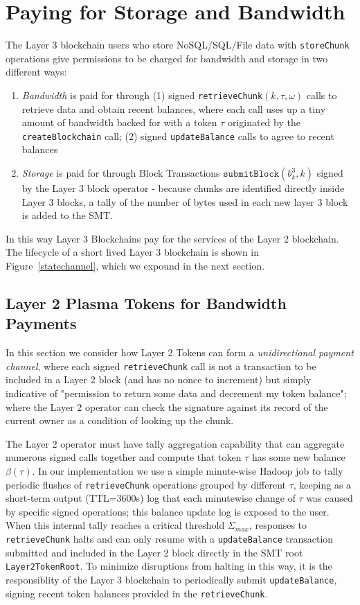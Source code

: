 \documentclass{article}
\newcommand{\blockhash}[2]{b^{#1}_{#2}}
\newcommand{\signature}{\omega}
\newcommand{\submitblock}[2]{\texttt{submitBlock}(#2, #1)}
\newcommand{\balance}{\beta}
\begin{document}
\section{Paying for Storage and Bandwidth}

The Layer 3 blockchain users who store NoSQL/SQL/File data with \texttt{storeChunk} operations give permissions to be charged for bandwidth and storage in two different ways:

\begin{enumerate}
\item {\em Bandwidth} is paid for through (1) signed  \texttt{retrieveChunk}$(k, \tau, \signature)$ calls to retrieve data and obtain recent balances, where each call uses up a tiny amount of bandwidth backed for with a token $\tau$ originated by the \texttt{createBlockchain} call; (2) signed \texttt{updateBalance} calls to agree to recent balances

\item {\em Storage} is paid for through Block Transactions $\submitblock{k}{\blockhash{3}{k}}$ signed by the Layer 3 block operator - because chunks are identified directly inside Layer 3 blocks, a tally of the number of bytes used in each new layer 3 block is added to the SMT.
\end{enumerate}
In this way Layer 3 Blockchains pay for the services of the Layer 2 blockchain.  The lifecycle of a short lived Layer 3 blockchain is shown in Figure~\ref{statechannel}, which we expound in the next section.

\subsection{Layer 2 Plasma Tokens for Bandwidth Payments}

In this section we  consider how Layer 2 Tokens can form a {\em unidirectional payment channel}, where each signed \texttt{retrieveChunk} call is not a transaction to be included in a Layer 2 block (and has no nonce to increment) but simply indicative of "permission to return some data and decrement my token balance"; where the Layer 2 operator can check the signature against its record of the current owner as a condition of looking up the chunk.

The Layer 2 operator must have tally aggregation capability that can aggregate numerous signed calls together and compute that token $\tau$ has some new balance $\balance(\tau)$.  In our implementation we use a simple minute-wise Hadoop job to tally periodic flushes of \texttt{retrieveChunk} operations grouped by different $\tau$, keeping as a short-term output (TTL=3600s) log that each minutewise change of $\tau$ was caused by specific signed operations; this balance update log is exposed to the user.  When this internal tally reaches a critical threshold $\Sigma_{max}$, responses to \texttt{retrieveChunk} halts and can only resume with a \texttt{updateBalance} transaction submitted and included in the Layer 2 block directly in the SMT root \texttt{Layer2TokenRoot}.    To minimize disruptions from halting in this way, it is the responsiblity of the Layer 3 blockchain to periodically submit \texttt{updateBalance}, signing recent token balances provided in the  \texttt{retrieveChunk}.
\end{document}
